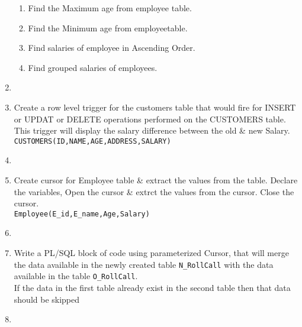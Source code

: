 \documentclass{article}
\newcommand{\answer}{\item[$\rightarrow$]}
\begin{document}
\begin{enumerate}[label=\arabic*. ]
\begin{enumerate}[label=\alph*) ]
			\item Find the Maximum age from employee table.
			\item Find the Minimum age from employeetable.
			\item Find salaries of employee in Ascending Order.
			\item Find grouped salaries of employees.
		\end{enumerate}
		\answer \inputminted{mysql}{../Lab3.sql} \newpage
		\item Create a row level trigger for the customers table that would fire for INSERT or UPDAT or
			DELETE operations performed on the CUSTOMERS table. This trigger will display the salary
		difference between the old \& new Salary. \texttt{CUSTOMERS(ID,NAME,AGE,ADDRESS,SALARY)}
		\answer \inputminted{mysql}{../Lab4.sql} \newpage
		\item Create cursor for Employee table \& extract the values from the table.
			Declare the variables, Open the cursor \& extrct the values from the cursor.
			Close the cursor. \\ \texttt{Employee(E\_id,E\_name,Age,Salary)}
		\answer \inputminted{mysql}{../Lab5.sql} \newpage
		\item Write a PL/SQL block of code using parameterized Cursor, that will merge the data available in
			the newly created table \texttt{N\_RollCall} with the data available in the table
			\texttt{O\_RollCall}. \\
			If the data in the first table already exist in the second table then that data should be skipped
		\answer \inputminted{mysql}{Lab6.sql}
	\end{enumerate}
\end{document}
